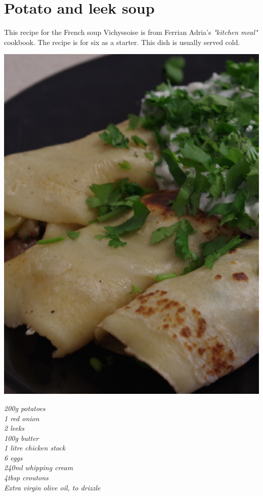 \documentclass{tufte-book}
\begin{document}
\section{Potato and leek soup}

This recipe for the French soup Vichyssoise is from Ferrian Adria's \emph{"kitchen meal"} cookbook. The recipe is for six as a starter. This dish is usually served cold.

\begin{marginfigure}%
  \includegraphics[width=\linewidth]{masalapancakes.png}
\end{marginfigure}

\smallskip
\emph{200g potatoes
\\1 red onion
\\2 leeks
\\100g butter
\\1 litre chicken stock
\\6 eggs
\\240ml whipping cream
\\4tbsp croutons
\\Extra virgin olive oil, to drizzle}
\end{document}
